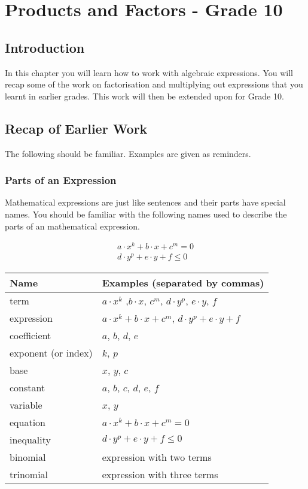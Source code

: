 \documentclass[10pt,a4paper,titlepage,twoside,openright]{report}
\begin{document}




\chapter{Products and Factors - Grade 10}
\label{m:pf:10}

\section{Introduction}
In this chapter you will learn how to work with algebraic expressions. You will recap some of the work on factorisation and multiplying out expressions that you learnt in earlier grades. This work will then be extended upon for Grade 10. 

\section{Recap of Earlier Work}
The following should be familiar. Examples are given as reminders.

\subsection{Parts of an Expression}
Mathematical expressions are just like sentences and their parts have special names. You should be familiar with the following names used to describe the parts of an mathematical expression.

\begin{eqnarray}
a\cdot x^k+b\cdot x + c^m = 0\\
d\cdot y^p+e\cdot y + f \le 0
\end{eqnarray}

\begin{table}[htbp]
\begin{center}
\begin{tabular}{|l|l|}\hline
Name & Examples (separated by commas)\\\hline\hline
term&$a\cdot x^k$ ,$b\cdot x$, $c^m$, $d \cdot y^p$, $e \cdot y$, $f$\\\hline
expression&$a\cdot x^k+b\cdot x + c^m$, $d\cdot y^p+e\cdot y + f$\\\hline
coefficient&$a$, $b$, $d$, $e$ \\\hline
exponent (or index)& $k$, $p$\\\hline
base& $x$, $y$, $c$\\\hline
constant&$a$, $b$, $c$, $d$, $e$, $f$\\\hline
variable&$x$, $y$ \\\hline
equation&$a\cdot x^k+b\cdot x + c^m = 0$ \\\hline
inequality&$d\cdot y^p+e\cdot y + f \le 0$ \\\hline
binomial&expression with two terms\\\hline
trinomial&expression with three terms\\\hline
\end{tabular}
\end{center}
\end{table}
\end{document}
